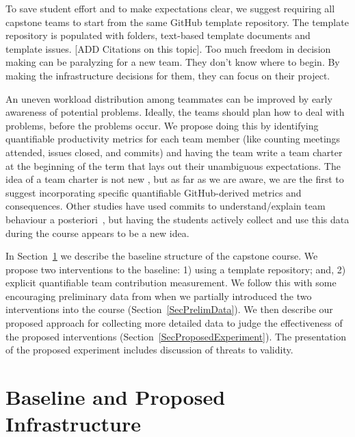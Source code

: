 \documentclass[10pt, conference]{IEEEtran}
\begin{document}
To save student effort and to make expectations clear, we suggest
requiring all capstone teams to start from the same GitHub template repository.
The template repository is populated with folders, text-based template documents
and template issues.  [ADD Citations on this topic]. Too much freedom in decision
making can be paralyzing for a new team.  They don't know where to begin.  By
making the infrastructure decisions for them, they can focus on their project.

An uneven workload distribution among teammates can be improved by early
awareness of potential problems. Ideally, the teams should plan how to deal with
problems, before the problems occur.  We propose doing this by identifying
quantifiable productivity metrics for each team member (like counting meetings
attended, issues closed, and commits) and having the team write a team charter
at the beginning of the term that lays out their unambiguous expectations.  The
idea of a team charter is not new \cite{mathieuLayingFoundationSuccessful2009,
johnsonTeamChartersHelp2022, hughstonEmpiricalStudyTeam2013}, but as far as we
are aware, we are the first to suggest incorporating specific quantifiable
GitHub-derived metrics and consequences. Other studies have used commits to
understand/explain team behaviour a
posteriori~\cite{gitinabardStudentTeamworkProgramming2020,
tushevUsingGitHubLarge2020}, but having the students actively collect and use
this data during the course appears to be a new idea.

In Section~\ref{SecInfrastruct} we describe the baseline structure of the
capstone course.  We propose two interventions to the baseline: 1) using a
template repository; and, 2) explicit quantifiable team contribution
measurement. We follow this with some encouraging preliminary data from when we
partially introduced the two interventions into the course
(Section~\ref{SecPrelimData}).  We then describe our proposed approach for
collecting more detailed data to judge the effectiveness of the proposed
interventions (Section~\ref{SecProposedExperiment}). The presentation of the
proposed experiment includes discussion of threats to validity.

\section{Baseline and Proposed Infrastructure} \label{SecInfrastruct}
\end{document}
